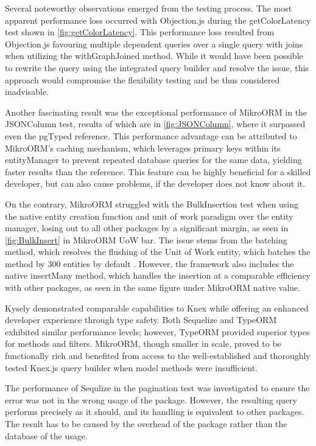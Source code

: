 Several noteworthy observations emerged from the testing process. The most
apparent performance loss occurred with Objection.js during the getColorLatency
test shown in \autoref{fig:getColorLatency}. This performance loss resulted from
Objection.js favouring multiple dependent queries over a single query with joins
when utilizing the withGraphJoined method. While it would have been possible to
rewrite the query using the integrated query builder and resolve the issue, this
approach would compromise the flexibility testing and be thus considered
inadvisable.

Another fascinating result was the exceptional performance of MikroORM in the
JSONColumn test, results of which are in \autoref{fig:JSONColumn}, where it
surpassed even the pgTyped reference. This performance advantage can be
attributed to MikroORM's caching mechanism, which leverages primary keys within
its entityManager to prevent repeated database queries for the same data,
yielding faster results than the reference. This feature can be highly
beneficial for a skilled developer, but can also cause problems, if the
developer does not know about it.

On the contrary, MikroORM struggled with the BulkInsertion test when using the
native entity creation function and unit of work paradigm over the entity
manager, losing out to all other packages by a significant margin, as seen in
\autoref{fig:BulkInsert} in MikroORM UoW bar. The issue stems from the batching
method, which resolves the flushing of the Unit of Work entity, which batches
the method by 300 entities by default \cite{MikroORMBatching}. However, the
framework also includes the native insertMany method, which handles the
insertion at a comparable efficiency with other packages, as seen in the same
figure under MikroORM native value.

Kysely demonstrated comparable capabilities to Knex while offering an enhanced
developer experience through type safety. Both Sequelize and TypeORM exhibited
similar performance levels; however, TypeORM provided superior types for methods
and filters. MikroORM, though smaller in scale, proved to be functionally rich
and benefited from access to the well-established and thoroughly tested Knex.js
query builder when model methods were insufficient.

The performance of Sequlize in the pagination test was investigated to ensure
the error was not in the wrong usage of the package. However, the resulting
query performs precisely as it should, and its handling is equivalent to other
packages. The result has to be caused by the overhead of the package rather than
the database of the usage.

